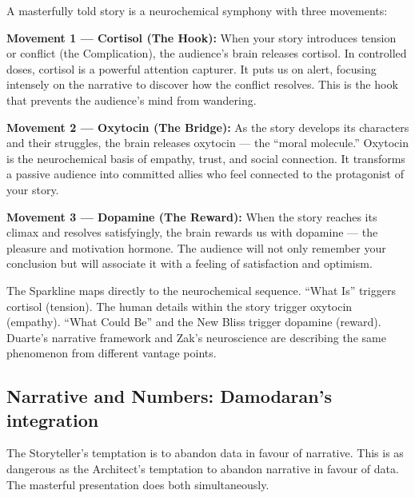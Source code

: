 \begin{insightbox}
A masterfully told story is a neurochemical symphony with three movements:

\textbf{Movement 1 --- Cortisol (The Hook):} When your story introduces tension or conflict (the Complication), the audience's brain releases cortisol. In controlled doses, cortisol is a powerful attention capturer. It puts us on alert, focusing intensely on the narrative to discover how the conflict resolves. This is the hook that prevents the audience's mind from wandering.

\textbf{Movement 2 --- Oxytocin (The Bridge):} As the story develops its characters and their struggles, the brain releases oxytocin --- the ``moral molecule.'' Oxytocin is the neurochemical basis of empathy, trust, and social connection. It transforms a passive audience into committed allies who feel connected to the protagonist of your story.

\textbf{Movement 3 --- Dopamine (The Reward):} When the story reaches its climax and resolves satisfyingly, the brain rewards us with dopamine --- the pleasure and motivation hormone. The audience will not only remember your conclusion but will associate it with a feeling of satisfaction and optimism.
\end{insightbox}

\begin{insightbox}
The Sparkline maps directly to the neurochemical sequence. ``What Is'' triggers cortisol (tension). The human details within the story trigger oxytocin (empathy). ``What Could Be'' and the New Bliss trigger dopamine (reward). Duarte's narrative framework and Zak's neuroscience are describing the same phenomenon from different vantage points.
\end{insightbox}


\subsection{Narrative and Numbers: Damodaran's integration}

The Storyteller's temptation is to abandon data in favour of narrative. This is as dangerous as the Architect's temptation to abandon narrative in favour of data. The masterful presentation does both simultaneously.

